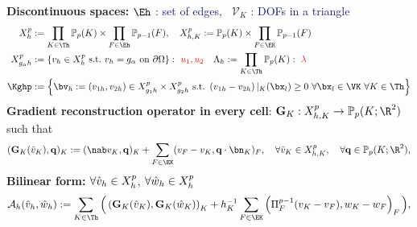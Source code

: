 \begin{frame}
  \textcolor{cadmiumgreen}{\textbf{Discontinuous spaces:}} \hspace{4 cm} $\Eh$ : \textcolor{midnightblue}{set of edges}, \ $\mathcal{V}_K$ : \textcolor{midnightblue}{DOFs in a triangle}
    \begin{equation*}
    \begin{split}
      X_h^p &:= \prod_{K \in \Th} \mathbb{P}_p(K) \times \prod_{F \in \Eh} \mathbb{P}_{p-1}(F), \quad X_{h,K}^p:= \mathbb{P}_p(K) \times \prod_{F \in \EK} \mathbb{P}_{p-1}(F)\\
      X_{g_{\alpha} h}^p &:= \left\{ v_h \in  X_h^p \ \text{s.t.} \ v_h=g_{\alpha} \ \text{on} \ \partial \Omega \right\}: \ \textcolor{red}{u_1, u_2} \quad \Lambda_h := \prod_{K \in \Th} \mathbb{P}_p(K): \ \textcolor{red}{\lambda}  \\
       \Kghp & := \left\{ \bv_h := \left(v_{1h},v_{2h}  \right) \in X_{g_1 h}^p \times X_{g_2 h}^p \ \text{s.t.} \ \left(v_{1h} - v_{2h}\right)|_{K}(\bx_l) \geq 0 \ \forall \bx_l \in \VK \ \forall K \in \Th \right\}
    \end{split}
    \end{equation*}
    \textcolor{cadmiumgreen}{\textbf{Gradient reconstruction operator in every cell}:} 
$\bG_K : X_{h,K}^p \to \polP_p(K;\R^2)$ such that
\begin{equation*}
  ( \bG_K(\hv_K) , \bq )_{K} \egaldef (\nab v_K , \bq )_K 
  + \sum_{F \in \EK} (v_{F} - v_K , \bq \SCAL \bn_K)_{F} , \quad \forall \hv_K \in X_{h,K}^p, \quad \forall \bq \in \polP_p(K;\R^2),
\end{equation*}
\textcolor{cadmiumgreen}{\textbf{Bilinear form:}} $\forall \hat{v}_h \in X_h^p$, $\forall \hat{w}_h \in X_h^p$
\begin{equation*}
  \begin{split}
  \mathcal{A}_h(\hv_h , \hw_h) \egaldef
  \sum_{K \in \Th} \Big(
  \left(\bG_K(\hv_{K}) , \bG_K(\hw_{K})\right)_{K}
  + h_K^{-1} \sum_{F \in \EK} \left(\Pi_{F}^{p-1}(v_{K} - v_{F}) , w_{K} - w_{F}\right)_{F} 
  \Big) ,
\end{split}
\end{equation*}
\end{frame}
